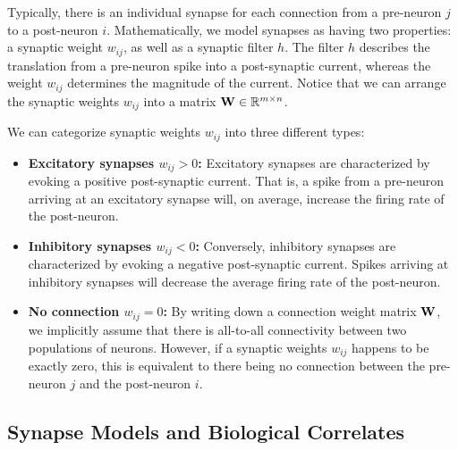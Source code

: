\documentclass[10pt,letterpaper,oneside]{article}
\begin{document}
	Typically, there is an individual synapse for each connection from a pre-neuron $j$ to a post-neuron $i$. Mathematically, we model synapses as having two properties: a synaptic weight $w_{ij}$, as well as a synaptic filter $h$. The filter $h$ describes the translation from a pre-neuron spike into a post-synaptic current, whereas the weight $w_{ij}$ determines the magnitude of the current. Notice that we can arrange the synaptic weights $w_{ij}$ into a matrix ${\mathbf{W}} \in \mathbb{R}^{m \times n}$.

	We can categorize synaptic weights $w_{ij}$ into three different types:
	\begin{itemize}
		\item\textbf{Excitatory synapses $w_{ij} > 0$:}
		Excitatory synapses are characterized by evoking a positive post-synaptic current. That is, a spike from a pre-neuron arriving at an excitatory synapse will, on average, increase the firing rate of the post-neuron.
		\item\textbf{Inhibitory synapses $w_{ij} < 0$:}
		Conversely, inhibitory synapses are characterized by evoking a negative post-synaptic current. Spikes arriving at inhibitory synapses will decrease the average firing rate of the post-neuron.
		\item\textbf{No connection $w_{ij} = 0$:}
		By writing down a connection weight matrix ${\mathbf{W}}$, we implicitly assume that there is all-to-all connectivity between two populations of neurons. However, if a synaptic weights $w_{ij}$ happens to be exactly zero, this is equivalent to there being no connection between the pre-neuron $j$ and the post-neuron $i$.
	\end{itemize}


	\subsection{Synapse Models and Biological Correlates}
\end{document}
